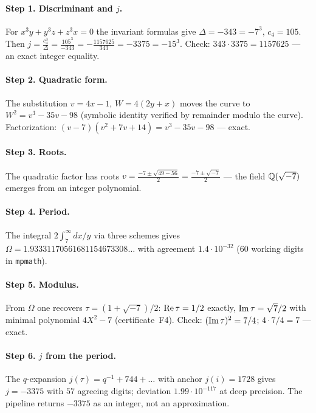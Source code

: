 \paragraph{Step 1. Discriminant and $j$.} For
$x^3y+y^3z+z^3x=0$ the invariant formulas give $\Delta=-343=-7^3$,
$c_4=105$. Then
$j=\frac{c_4^3}{\Delta}=\frac{105^3}{-343}=-\frac{1157625}{343}
=-3375=-15^3$. Check: $343\cdot3375=1157625$ --- an exact integer
equality.

\paragraph{Step 2. Quadratic form.} The substitution $v=4x-1$,
$W=4(2y+x)$ moves the curve to $W^2=v^3-35v-98$ (symbolic identity
verified by remainder modulo the curve). Factorization:
$(v-7)(v^2+7v+14)=v^3-35v-98$ --- exact.

\paragraph{Step 3. Roots.} The quadratic factor has roots
$v=\frac{-7\pm\sqrt{49-56}}{2}=\frac{-7\pm\sqrt{-7}}{2}$ --- the
field $\mathbb{Q}(\sqrt{-7})$ emerges from an integer polynomial.

\paragraph{Step 4. Period.} The integral $2\int_7^\infty dx/y$ via
three schemes gives $\Omega=1.93331170561681154673308\ldots$ with
agreement $1.4\cdot10^{-32}$ ($60$ working digits in
\texttt{mpmath}).

\paragraph{Step 5. Modulus.} From $\Omega$ one recovers
$\tau=(1+\sqrt{-7})/2$: $\operatorname{Re}\tau=1/2$ exactly, $\operatorname{Im}\tau=\sqrt7/2$
with minimal polynomial $4X^2-7$ (certificate~F4). Check:
$(\operatorname{Im}\tau)^2=7/4$; $4\cdot7/4=7$ --- exact.

\paragraph{Step 6. $j$ from the period.} The $q$-expansion
$j(\tau)=q^{-1}+744+\dots$ with anchor $j(i)=1728$ gives $j=-3375$
with $57$ agreeing digits; deviation $1.99\cdot10^{-117}$ at deep
precision. The pipeline returns $-3375$ as an integer, not an
approximation.

